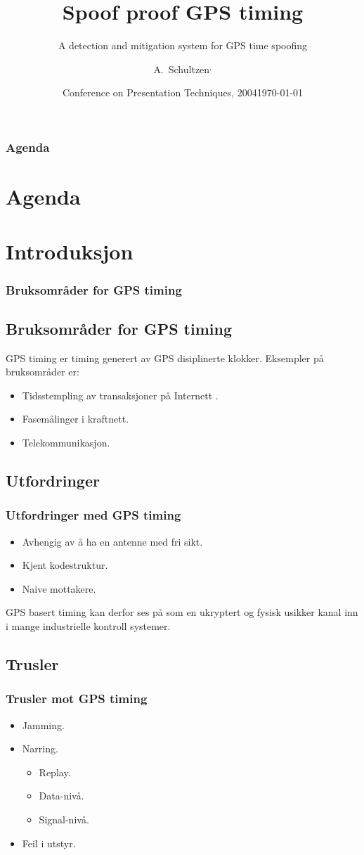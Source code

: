 \documentclass[xcolor=table]{beamer}
\title[Spoof proof GPS timing] %
{Spoof proof GPS timing}
\subtitle{A detection and mitigation system for GPS time spoofing}
\author[A. Schultzen] %
{A.~Schultzen\inst{1}$^{,}$\inst{3}}
\institute[Universities Here and There] %
{
  \inst{1}%
  Department of Informatics\\
  University of Oslo
  \and
  \inst{3}
  UNIK\\
  University Graduate Center
}
\date[KPT 2004] %
{Conference on Presentation Techniques, 2004}
\date{\today}
\begin{document}
\frame{\titlepage}
\begin{frame}
\frametitle{Agenda}
\section *{Agenda}
\tableofcontents
\end{frame}

\section{Introduksjon}
\begin{frame}
\frametitle{Bruksområder for GPS timing}
	\subsection{Bruksområder for GPS timing}
  GPS timing er timing generert av GPS disiplinerte klokker. Eksempler på bruksområder er:
  \begin{itemize}
    \item Tidsstempling av transaksjoner på Internett .
    \item Fasemålinger i kraftnett.
    \item Telekommunikasjon.
  \end{itemize}
\end{frame}

\subsection{Utfordringer}
\begin{frame}
\frametitle{Utfordringer med GPS timing}
  \begin{itemize}
    \item Avhengig av å ha en antenne med fri sikt.
    \item Kjent kodestruktur.
    \item Naive mottakere.
  \end{itemize}
  GPS basert timing kan derfor ses på som en ukryptert og fysisk usikker kanal inn i mange industrielle kontroll systemer.
\end{frame}

\subsection{Trusler}
\begin{frame}
\frametitle{Trusler mot GPS timing}
\begin{itemize}
  \item Jamming.
  \item Narring.
  \begin{itemize}
    \item Replay.
    \item Data-nivå. 
    \item Signal-nivå.
  \end{itemize}
  \item Feil i utstyr.
\end{itemize}    
\end{frame}
\end{document}
